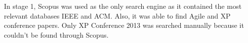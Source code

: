 \documentclass{sig-alternate}
\newcommand{\juha}[1]{\ignorespaces}
\begin{document}



In stage 1, Scopus was used as the only search engine as it contained the most
relevant databases IEEE and ACM. Also, it was able to find Agile and XP conference
papers. Only XP Conference 2013 was searched manually because it couldn't be
found through Scopus.



\end{document}
